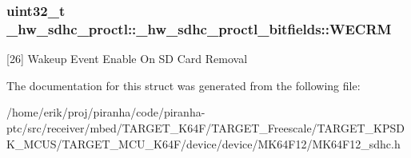 \subsubsection[{\texorpdfstring{W\+E\+C\+RM}{WECRM}}]{\setlength{\rightskip}{0pt plus 5cm}uint32\+\_\+t \+\_\+hw\+\_\+sdhc\+\_\+proctl\+::\+\_\+hw\+\_\+sdhc\+\_\+proctl\+\_\+bitfields\+::\+W\+E\+C\+RM}\hypertarget{struct__hw__sdhc__proctl_1_1__hw__sdhc__proctl__bitfields_aeb4e4061b8679bd03f32dbfc82595102}{}\label{struct__hw__sdhc__proctl_1_1__hw__sdhc__proctl__bitfields_aeb4e4061b8679bd03f32dbfc82595102}
\mbox{[}26\mbox{]} Wakeup Event Enable On SD Card Removal 

The documentation for this struct was generated from the following file\+:\begin{DoxyCompactItemize}
\item 
/home/erik/proj/piranha/code/piranha-\/ptc/src/receiver/mbed/\+T\+A\+R\+G\+E\+T\+\_\+\+K64\+F/\+T\+A\+R\+G\+E\+T\+\_\+\+Freescale/\+T\+A\+R\+G\+E\+T\+\_\+\+K\+P\+S\+D\+K\+\_\+\+M\+C\+U\+S/\+T\+A\+R\+G\+E\+T\+\_\+\+M\+C\+U\+\_\+\+K64\+F/device/device/\+M\+K64\+F12/M\+K64\+F12\+\_\+sdhc.\+h\end{DoxyCompactItemize}
